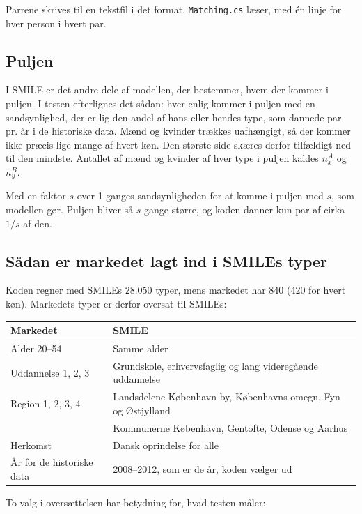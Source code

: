 \documentclass[11pt,a4paper]{article}
\newcommand{\kode}[1]{\texttt{#1}}
\begin{document}
Parrene skrives til en tekstfil i det format, \kode{Matching.cs} læser, med én linje for hver person
i hvert par.

\subsection{Puljen}

I SMILE er det andre dele af modellen, der bestemmer, hvem der kommer i puljen. I testen efterlignes
det sådan: hver enlig kommer i puljen med en sandsynlighed, der er lig den andel af hans eller hendes
type, som dannede par pr. år i de historiske data. Mænd og kvinder trækkes uafhængigt, så der kommer
ikke præcis lige mange af hvert køn. Den største side skæres derfor tilfældigt ned til den mindste.
Antallet af mænd og kvinder af hver type i puljen kaldes $n^A_x$ og $n^B_y$.

Med en faktor $s$ over 1 ganges sandsynligheden for at komme i puljen med $s$, som modellen gør.
Puljen bliver så $s$ gange større, og koden danner kun par af cirka $1/s$ af den.

\subsection{Sådan er markedet lagt ind i SMILEs typer}\label{sec:indlejring}

Koden regner med SMILEs 28.050 typer, mens markedet har 840 (420 for hvert køn). Markedets typer er
derfor oversat til SMILEs:

\begin{center}
\begin{tabular}{@{}ll@{}}
\toprule
Markedet & SMILE \\
\midrule
Alder 20--54 & Samme alder \\
Uddannelse 1, 2, 3 & Grundskole, erhvervsfaglig og lang videregående uddannelse \\
Region 1, 2, 3, 4 & Landsdelene København by, Københavns omegn, Fyn og Østjylland \\
 & Kommunerne København, Gentofte, Odense og Aarhus \\
Herkomst & Dansk oprindelse for alle \\
År for de historiske data & 2008--2012, som er de år, koden vælger ud \\
\bottomrule
\end{tabular}
\end{center}

To valg i oversættelsen har betydning for, hvad testen måler:
\end{document}

